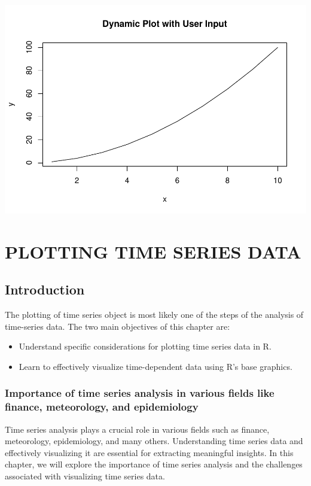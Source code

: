 \documentclass[
]{book}
\providecommand{\tightlist}{%
  \setlength{\itemsep}{0pt}\setlength{\parskip}{0pt}}
\begin{document}
\includegraphics{_main_files/figure-latex/unnamed-chunk-56-1.pdf}

\chapter{PLOTTING TIME SERIES DATA}\label{plotting-time-series-data}

\section{Introduction}\label{introduction-3}

The plotting of time series object is most likely one of the steps of the analysis of time-series data. The two main objectives of this chapter are:

\begin{itemize}
\tightlist
\item
  Understand specific considerations for plotting time series data in R.
\item
  Learn to effectively visualize time-dependent data using R's base graphics.
\end{itemize}

\subsection{Importance of time series analysis in various fields like finance, meteorology, and epidemiology}\label{importance-of-time-series-analysis-in-various-fields-like-finance-meteorology-and-epidemiology}

Time series analysis plays a crucial role in various fields such as finance, meteorology, epidemiology, and many others. Understanding time series data and effectively visualizing it are essential for extracting meaningful insights. In this chapter, we will explore the importance of time series analysis and the challenges associated with visualizing time series data.
\end{document}
